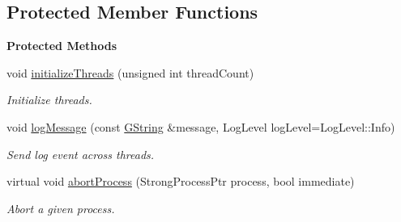 \subsection*{Protected Member Functions}
\begin{Indent}\textbf{ Protected Methods}\par
\begin{DoxyCompactItemize}
\item 
\mbox{\label{classrev_1_1_process_manager_ae93eb02df68e26d9685fbae93e06e026}} 
void \mbox{\hyperlink{classrev_1_1_process_manager_ae93eb02df68e26d9685fbae93e06e026}{initialize\+Threads}} (unsigned int thread\+Count)
\begin{DoxyCompactList}\small\item\em Initialize threads. \end{DoxyCompactList}\item 
\mbox{\label{classrev_1_1_process_manager_ace873e5a3643d742c3c4a53e0d268c9a}} 
void \mbox{\hyperlink{classrev_1_1_process_manager_ace873e5a3643d742c3c4a53e0d268c9a}{log\+Message}} (const \mbox{\hyperlink{classrev_1_1_g_string}{G\+String}} \&message, Log\+Level log\+Level=Log\+Level\+::\+Info)
\begin{DoxyCompactList}\small\item\em Send log event across threads. \end{DoxyCompactList}\item 
\mbox{\label{classrev_1_1_process_manager_a98affeb775af57b234a2a8871994d2f9}} 
virtual void \mbox{\hyperlink{classrev_1_1_process_manager_a98affeb775af57b234a2a8871994d2f9}{abort\+Process}} (Strong\+Process\+Ptr process, bool immediate)
\begin{DoxyCompactList}\small\item\em Abort a given process. \end{DoxyCompactList}\end{DoxyCompactItemize}
\end{Indent}
